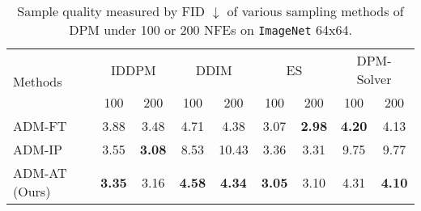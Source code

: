 \begin{table*}[t!]
\centering
\caption{Sample quality measured by FID $\downarrow$ of various sampling methods of DPM under 100 or 200 NFEs on \texttt{ImageNet} 64x64.}
\begin{tabular}{lcccccccc}
\toprule
    \multirow{2}{*}{Methods} & \multicolumn{2}{c}{IDDPM} & \multicolumn{2}{c}{DDIM} & \multicolumn{2}{c}{ES} & \multicolumn{2}{c}{DPM-Solver}\\ 
    & 100 & 200 & 100 & 200 & 100 & 200 & 100 & 200 \\
    \midrule
    ADM-FT & 3.88 & 3.48 & 4.71 & 4.38 & 3.07 & \bf 2.98 & \bf 4.20 & 4.13 \\
    ADM-IP & 3.55 & \bf 3.08 & 8.53 & 10.43 & 3.36 & 3.31 & 9.75 & 9.77 \\
    ADM-AT (Ours) & \bf 3.35 & 3.16 & \bf 4.58 & \bf 4.34 & \bf 3.05 & 3.10 & 4.31 & \bf 4.10 \\
    \bottomrule
    \end{tabular}
\label{tab:i64_more_nfe}
\end{table*}
